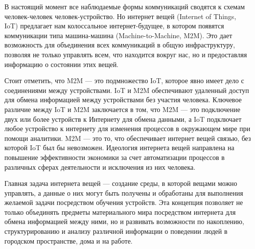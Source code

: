 \Introduction


В настоящий момент все наблюдаемые формы коммуникаций сводятся к схемам человек-человек  человек-устройство. Но интернет вещей (Internet of Things, IoT) предлагает нам колоссальное интернет-будущее, в котором появятся коммуникации типа машина-машина (Machine-to-Machine, M2M). Это дает возможность для объединения всех коммуникаций в общую инфраструктуру, позволяя не только управлять всем, что находится вокруг нас, но и предоставляя информацию о состоянии этих вещей. \cite{Dovgal}

Стоит отметить, что M2M --- это подмножество IoT, которое явно имеет дело с соединениями между устройствами. IoT и M2M обеспечивают удаленный доступ для обмена информацией между устройствами без участия человека. Ключевое различие между IoT и M2M заключается в том, что M2M — это подключение двух или более устройств к Интернету для обмена данными, а IoT подключает любое устройство к интернету для изменения процессов в окружающем мире при помощи аналитики. M2M --- это то, что обеспечивает интернет вещей связью, без которой IoT был бы невозможен. Идеология интернета вещей направлена на повышение эффективности экономики за счет автоматизации процессов в различных сферах деятельности и исключения из них человека.







Главная задача интернета вещей \cite{Markeeva} --- создание среды, в которой вещами можно управлять, а данные о них могут быть получены и обработаны для выполнения желаемой задачи посредством обучения устройств. Эта концепция позволяет не только объединять предметы материального мира посредством интернета для обмена информацией между ними, но и развивать возможности по накоплению, структурированию и анализу различной информации о поведении людей в городском пространстве, дома и на работе.

